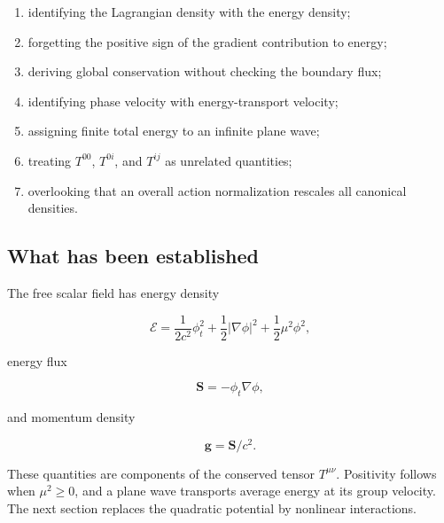 \begin{enumerate}
    \item identifying the Lagrangian density with the energy density;
    \item forgetting the positive sign of the gradient contribution to energy;
    \item deriving global conservation without checking the boundary flux;
    \item identifying phase velocity with energy-transport velocity;
    \item assigning finite total energy to an infinite plane wave;
    \item treating \(T^{00}\), \(T^{0i}\), and \(T^{ij}\) as unrelated quantities;
    \item overlooking that an overall action normalization rescales all canonical densities.
\end{enumerate}

\subsection{What has been established}

The free scalar field has energy density

\[
\mathcal{E}
=
\frac{1}{2c^{2}}\phi_{t}^{2}
+
\frac{1}{2}|\nabla\phi|^{2}
+
\frac{1}{2}\mu^{2}\phi^{2},
\]

energy flux

\[
\mathbf{S}=-\phi_{t}\nabla\phi,
\]

and momentum density

\[
\mathbf{g}=\mathbf{S}/c^{2}.
\]

These quantities are components of the conserved tensor \(T^{\mu\nu}\). Positivity follows when \(\mu^{2}\geq0\), and a plane wave transports average energy at its group velocity. The next section replaces the quadratic potential by nonlinear interactions.